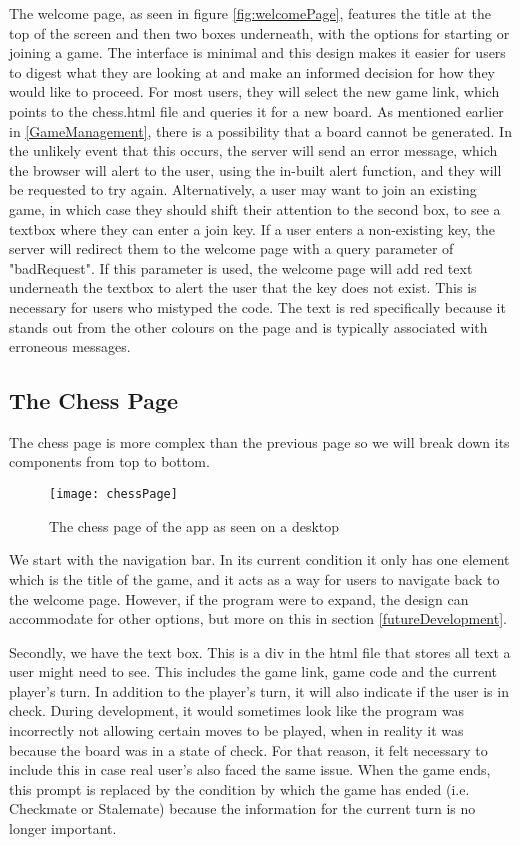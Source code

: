 The welcome page, as seen in figure \ref{fig:welcomePage}, features the title at the top of the screen and then two boxes underneath, with the options for starting or joining a game. The interface is minimal and this design makes it easier for users to digest what they are looking at and make an informed decision for how they would like to proceed. For most users, they will select the new game link, which points to the chess.html file and queries it for a new board. As mentioned earlier in \ref{GameManagement}, there is a possibility that a board cannot be generated. In the unlikely event that this occurs, the server will send an error message, which the browser will alert to the user, using the in-built alert function, and they will be requested to try again. Alternatively, a user may want to join an existing game, in which case they should shift their attention to the second box, to see a textbox where they can enter a join key. If a user enters a non-existing key, the server will redirect them to the welcome page with a query parameter of "badRequest". If this parameter is used, the welcome page will add red text underneath the textbox to alert the user that the key does not exist. This is necessary for users who mistyped the code. The text is red specifically because it stands out from the other colours on the page and is typically associated with erroneous messages.

\subsection{The Chess Page}
\label{TheChessPage}

The chess page is more complex than the previous page so we will break down its components from top to bottom.

\begin{figure}
    \begin{center}
        \texttt{[image: chessPage]}
        \caption{The chess page of the app as seen on a desktop}
    \end{center}
\end{figure}

We start with the navigation bar. In its current condition it only has one element which is the title of the game, and it acts as a way for users to navigate back to the welcome page. However, if the program were to expand, the design can accommodate for other options, but more on this in section \ref{futureDevelopment}.

Secondly, we have the text box. This is a div in the html file that stores all text a user might need to see. This includes the game link, game code and the current player's turn. In addition to the player's turn, it will also indicate if the user is in check. During development, it would sometimes look like the program was incorrectly not allowing certain moves to be played, when in reality it was because the board was in a state of check. For that reason, it felt necessary to include this in case real user's also faced the same issue. When the game ends, this prompt is replaced by the condition by which the game has ended (i.e. Checkmate or Stalemate) because the information for the current turn is no longer important.

